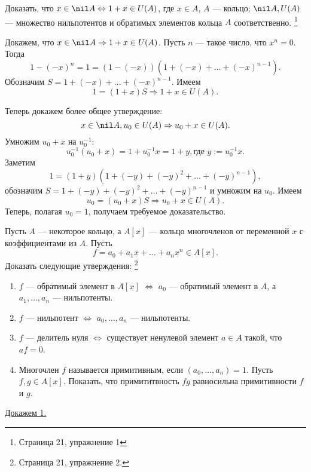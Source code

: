     \begin{Ex} \label{ex_1}
        Доказать, что $x \in \nil A \Leftrightarrow 1 + x \in U(A)$, где $x \in A$, $A$ --- кольцо; $\nil A, U(A)$ --- множество нильпотентов и 
        обратимых элементов кольца $A$ соответственно.
        \footnote{\cite{A-M} Страница 21, упражнение 1}
    \end{Ex}
    \begin{Proof}

        Докажем, что $x \in \nil A \Rightarrow 1+x \in U(A)$.
        Пусть $n$ --- такое число, что $x^n = 0$. Тогда
        $$
            1 - (-x)^n = 1 = (1 - (-x))(1 + (-x) + \dots + (-x)^{n-1}).
        $$
        Обозначим $S = 1 + (-x) + \dots + (-x)^{n-1}$. Имеем 
        $$
            1 = (1 + x)S \Rightarrow 1 + x \in U(A).
        $$

        Теперь докажем более общее утверждение: 
        $$
            x \in \nil A, u_0 \in U(A) \Rightarrow u_0 + x \in U(A).
        $$
        Умножим $u_0 + x$ на $u_0^{-1}$:
        $$
            u_0^{-1}(u_0 + x) = 1 + u_0^{-1}x = 1 + y, \text{где } y := u_0^{-1}x.
        $$
        Заметим
        $$
            1 = (1 + y)(1 + (-y) + (-y)^2 + \dots + (-y)^{n-1}),
        $$
        обозначим $S = 1 + (-y) + (-y)^2 + \dots + (-y)^{n-1}$ и умножим на $u_0$. Имеем
        $$
            u_0 = (u_0 + x)S \Rightarrow u_0 + x \in U(A).
        $$
        Теперь, полагая $u_0 = 1$, получаем требуемое доказательство.
    \end{Proof}

    
    \begin{Ex} \label{ex_2}
        Пусть $A$ --- некоторое кольцо, а $A[x]$ --- кольцо многочленов от переменной $x$ с коэффициентами из $A$. Пусть
        $$
            f = a_0 + a_1x + \dots + a_nx^n \in A[x].
        $$
        Доказать следующие утверждения: \footnote{\cite{A-M} Страница 21, упражнение 2.}
    \begin{enumerate}
            \item $f$ --- обратимый элемент в $A[x]$ $\Leftrightarrow$ $a_0$ --- обратимый элемент в $A$, а $a_1, \dots, a_n$ --- нильпотенты.
            \item $f$ --- нильпотент $\Leftrightarrow$ $a_0, \dots, a_n$ --- нильпотенты.
            \item $f$ --- делитель нуля $\Leftrightarrow$ существует ненулевой элемент $a \in A$ такой, что $af = 0$.
            \item Многочлен $f$ называется примитивным, если $(a_0, \dots, a_n) = 1$. Пусть $f, g \in A[x]$. Показать, что примититвность
                $fg$ равносильна примитивности $f$ и $g$. 
        \end{enumerate}
    \end{Ex}
    \underline{Докажем 1.}

